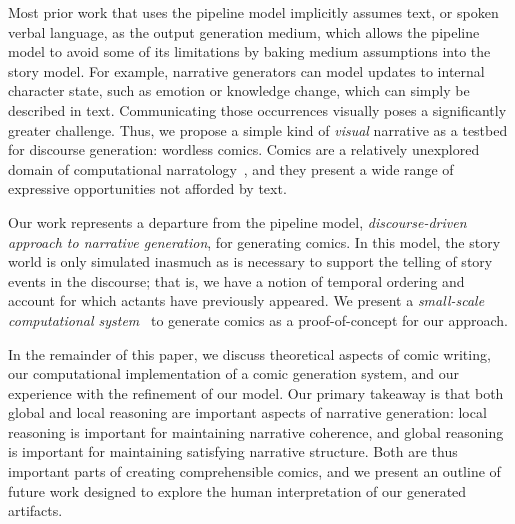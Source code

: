 Most prior work that uses the pipeline model implicitly assumes text, or
spoken verbal language, as the output generation medium, which allows the
pipeline model to avoid some of its limitations by baking medium
assumptions into the story model. For example, narrative generators can
model updates to internal character state, such as emotion or knowledge
change, which can simply be described in text. Communicating those
occurrences visually poses a significantly greater challenge.
Thus, we propose a simple kind of {\em visual} narrative as a testbed for
discourse generation: wordless comics. Comics are a relatively unexplored
domain of computational narratology~\cite{mani2012computational}, and they
present a wide range of expressive opportunities not afforded by text.

Our work represents a departure from the pipeline model, 
\emph{discourse-driven approach to narrative generation}, for generating
comics. In this model, the story world is only simulated inasmuch as is
necessary to support the telling of story events in the discourse; that is,
we have a notion of temporal ordering and account for which actants have
previously appeared. We present a \emph{small-scale computational
system}~\cite{montfort2012small} to generate comics as a proof-of-concept
for our approach.

In the remainder of this paper, we discuss theoretical aspects of comic
writing, our computational implementation of a comic generation system, and
our experience with the refinement of our model. Our primary takeaway is
that both global and local reasoning are important aspects of
narrative generation: local reasoning is important for maintaining
narrative coherence, and global reasoning is important for
maintaining satisfying narrative structure. Both are thus important parts
of creating comprehensible comics, and we present an outline of future work
designed to explore the human interpretation of our generated artifacts.



